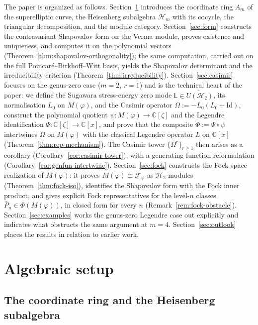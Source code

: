 \documentclass[12pt]{amsart}
\theoremstyle{plain}
\theoremstyle{definition}
\newcommand{\CC}{\mathbb{C}}
\newcommand{\Lalg}{{\mathsf{L}}}
\newcommand{\Hm}{{\mathcal{H}_m}}     %
\newcommand{\Mf}{M(\varphi)}          %
\newcommand{\Om}{\Omega}              %
\begin{document}
The paper is organized as follows. Section~\ref{sec:setup} introduces the coordinate ring $A_m$ of the superelliptic curve, the Heisenberg
subalgebra $\Hm$ with its cocycle, the triangular decomposition, and the module category.
Section~\ref{sec:form} constructs the contravariant Shapovalov form on the Verma module,
proves existence and uniqueness, and computes it on the polynomial vectors
(Theorem~\ref{thm:shapovalov-orthogonality}); the same computation, carried out on the
full Poincar\'e--Birkhoff--Witt basis, yields the Shapovalov determinant and the
irreducibility criterion (Theorem~\ref{thm:irreducibility}). Section~\ref{sec:casimir} focuses on the
genus-zero case ($m=2$, $r=1$) and is the technical heart of the paper: we define the
Sugawara stress-energy zero mode $\Lalg \in \widetilde{U(\mathcal{H}_2)}$, its
normalisation $L_0$ on $\Mf$, and the Casimir operator $\Om := -L_0(L_0+\mathrm{Id})$, construct the polynomial quotient
$\psi\colon\Mf \to \CC[\zeta]$ and the Legendre identification
$\Psi\colon\CC[\zeta]\to\CC[x]$, and prove that the composite $\Phi := \Psi\circ\psi$
intertwines $\Om$ on $\Mf$ with the classical Legendre operator $L$ on $\CC[x]$
(Theorem~\ref{thm:rep-mechanism}). The Casimir tower
$\{\Om^r\}_{r\geq 1}$ then arises as a corollary
(Corollary~\ref{cor:casimir-tower}), with a generating-function reformulation
(Corollary~\ref{cor:genfun-intertwine}).
Section~\ref{sec:fock} constructs the Fock space realization of $\Mf$:
it proves $\Mf \cong \mathcal{F}_\varphi$ as $\mathcal{H}_2$-modules
(Theorem~\ref{thm:fock-iso}), identifies the Shapovalov form with the Fock
inner product, and gives explicit Fock representatives for the level-$n$
classes $\bar{P}_n \in \Phi(\Mf)$, in closed form for every $n$
(Remark~\ref{rem:fock-obstacle}).
Section~\ref{sec:examples} works the genus-zero Legendre case out
explicitly and indicates what obstructs the same argument at $m = 4$.
Section~\ref{sec:outlook} places the results in relation to earlier
work.

\section{Algebraic setup}
\label{sec:setup}

\subsection{The coordinate ring and the Heisenberg subalgebra}
\label{subsec:algebra}
\end{document}
